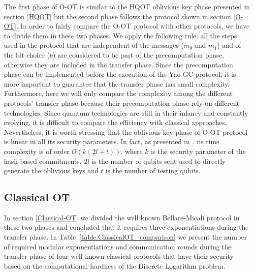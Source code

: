 The first phase of O-OT is similar to the HQOT oblivious key phase \cite{Lemus20} presented in section \ref{HQOT} but the second phase follows the protocol shown in section \ref{O-OT}. In order to fairly compare the O-OT protocol with other protocols, we have to divide them in these two phases. We apply the following rule: all the steps used in the protocol that are independent of the messages ($m_0$ and $m_1$) and of the bit choice ($b$) are considered to be part of the precomputation phase, otherwise they are included in the transfer phase. Since the precomputation phase can be implemented before the execution of the Yao GC protocol, it is more important to guarantee that the transfer phase has small complexity. Furthermore, here we will only compare the complexity among the different protocols' transfer phase because their precomputation phase rely on different technologies. Since quantum technologies are still in their infancy and constantly evolving, it is difficult to compare the efficiency with classical approaches. Nevertheless, it is worth stressing that the oblivious key phase of O-OT protocol is linear in all its security parameters. In fact, as presented in \cite{Lemus20}, its time complexity is of order $\mathcal{O}(k(2l + t))$, where $k$ is the security parameter of the hash-based commitments, $2l$ is the number of qubits sent used to directly generate the oblivious keys and $t$ is the number of testing qubits.

\subsection{Classical OT} \label{C-OT_comp}

In section \ref{Classical-OT} we divided the well known Bellare-Micali protocol in these two phases and concluded that it requires three exponentiations during the transfer phase. In Table~\ref{table:ClassicalOT_comparison} we present the number of required modular exponentiations and communication rounds during the transfer phase of four well known classical protocols that have their security based on the computational hardness of the Discrete Logarithm problem. 


